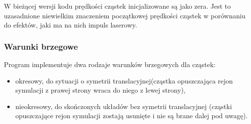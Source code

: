 
W bieżącej wersji kodu prędkości cząstek inicjalizowane są jako zera. Jest to
uzasadnione niewielkim znaczeniem początkowej prędkości cząstek w
porównaniu do efektów, jaki ma na nich impuls laserowy.







\subsubsection{Warunki brzegowe}
Program implementuje dwa rodzaje warunków brzegowych dla cząstek:
\begin{itemize}
\item okresowy, do sytuacji o symetrii translacyjnej(cząstka opuszczająca rejon symulacji z prawej strony wraca do niego z lewej strony),
\item nieokresowy, do skończonych układów bez symetrii translacyjnej (cząstki opuszczające rejon symulacji zostają usunięte i nie są brane
dalej pod uwagę).
\end{itemize}

